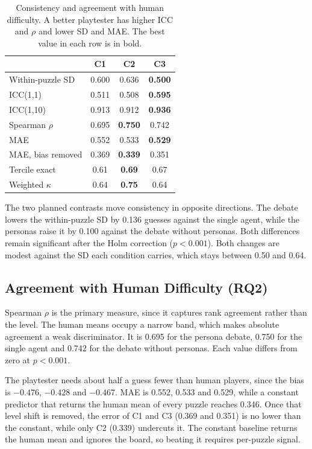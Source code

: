 \documentclass[conference]{IEEEtran}
\begin{document}
\begin{table}[t]
\caption{Consistency and agreement with human difficulty. A better playtester has higher ICC and $\rho$ and lower SD and MAE. The best value in each row is in bold.}
\label{tab:results}
\centering
\footnotesize
\begin{tabular}{@{}lccc@{}}
\hline
 & C1 & C2 & C3 \\
\hline
Within-puzzle SD & 0.600 & 0.636 & \textbf{0.500} \\
ICC(1,1) & 0.511 & 0.508 & \textbf{0.595} \\
ICC(1,10) & 0.913 & 0.912 & \textbf{0.936} \\
Spearman $\rho$ & 0.695 & \textbf{0.750} & 0.742 \\
MAE & 0.552 & 0.533 & \textbf{0.529} \\
MAE, bias removed & 0.369 & \textbf{0.339} & 0.351 \\
Tercile exact & 0.61 & \textbf{0.69} & 0.67 \\
Weighted $\kappa$ & 0.64 & \textbf{0.75} & 0.64 \\
\hline
\end{tabular}
\end{table}


The two planned contrasts move consistency in opposite directions. The debate lowers the within-puzzle SD by 0.136 guesses against the single agent, while the personas raise it by 0.100 against the debate without personas. Both differences remain significant after the Holm correction ($p < 0.001$). Both changes are modest against the SD each condition carries, which stays between 0.50 and 0.64.

\subsection{Agreement with Human Difficulty (RQ2)}
Spearman $\rho$ is the primary measure, since it captures rank agreement rather than the level. The human means occupy a narrow band, which makes absolute agreement a weak discriminator. It is 0.695 for the persona debate, 0.750 for the single agent and 0.742 for the debate without personas. Each value differs from zero at $p < 0.001$.

The playtester needs about half a guess fewer than human players, since the bias is $-0.476$, $-0.428$ and $-0.467$. MAE is 0.552, 0.533 and 0.529, while a constant predictor that returns the human mean of every puzzle reaches 0.346. Once that level shift is removed, the error of C1 and C3 (0.369 and 0.351) is no lower than the constant, while only C2 (0.339) undercuts it. The constant baseline returns the human mean and ignores the board, so beating it requires per-puzzle signal.
\end{document}

